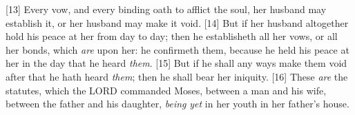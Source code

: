 [13] \textcolor[cmyk]{0.99998,1,0,0}{Every vow, and every binding oath to afflict the soul, her husband may establish it, or her husband may make it void.}
[14] \textcolor[cmyk]{0.99998,1,0,0}{But if her husband altogether hold his peace at her from day to day; then he establisheth all her vows, or all her bonds, which \emph{are} upon her: he confirmeth them, because he held his peace at her in the day that he heard \emph{them}.}
[15] \textcolor[cmyk]{0.99998,1,0,0}{But if he shall any ways make them void after that he hath heard \emph{them}; then he shall bear her iniquity.}
[16] \textcolor[cmyk]{0.99998,1,0,0}{These \emph{are} the statutes, which the LORD commanded Moses, between a man and his wife, between the father and his daughter, \emph{being} \emph{yet} in her youth in her father's house.}